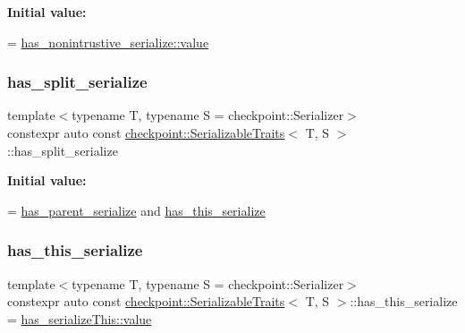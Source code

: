 {\bfseries Initial value\+:}
\begin{DoxyCode}
=
    \hyperlink{structdetection_1_1detector_a6d7d0e1bdf5903db9edbe448edccf83b}{has\_nonintrustive\_serialize::value}
\end{DoxyCode}
\mbox{\label{structcheckpoint_1_1_serializable_traits_a1fa333e360a0dfeafebe350436ae9141}} 
\subsubsection{\texorpdfstring{has\+\_\+split\+\_\+serialize}{has\_split\_serialize}}
{\footnotesize\ttfamily template$<$typename T, typename S = checkpoint\+::\+Serializer$>$ \\
constexpr auto const \hyperlink{structcheckpoint_1_1_serializable_traits}{checkpoint\+::\+Serializable\+Traits}$<$ T, S $>$\+::has\+\_\+split\+\_\+serialize\hspace{0.3cm}{\ttfamily [static]}}

{\bfseries Initial value\+:}
\begin{DoxyCode}
=
    \hyperlink{structcheckpoint_1_1_serializable_traits_a122e712dd9adffac78f239a7c30b0a8f}{has\_parent\_serialize} and \hyperlink{structcheckpoint_1_1_serializable_traits_ab228ede8ce64a9aaebf9ce43ac388400}{has\_this\_serialize}
\end{DoxyCode}
\mbox{\label{structcheckpoint_1_1_serializable_traits_ab228ede8ce64a9aaebf9ce43ac388400}} 
\subsubsection{\texorpdfstring{has\+\_\+this\+\_\+serialize}{has\_this\_serialize}}
{\footnotesize\ttfamily template$<$typename T, typename S = checkpoint\+::\+Serializer$>$ \\
constexpr auto const \hyperlink{structcheckpoint_1_1_serializable_traits}{checkpoint\+::\+Serializable\+Traits}$<$ T, S $>$\+::has\+\_\+this\+\_\+serialize = \hyperlink{structdetection_1_1detector_a6d7d0e1bdf5903db9edbe448edccf83b}{has\+\_\+serialize\+This\+::value}\hspace{0.3cm}{\ttfamily [static]}}

